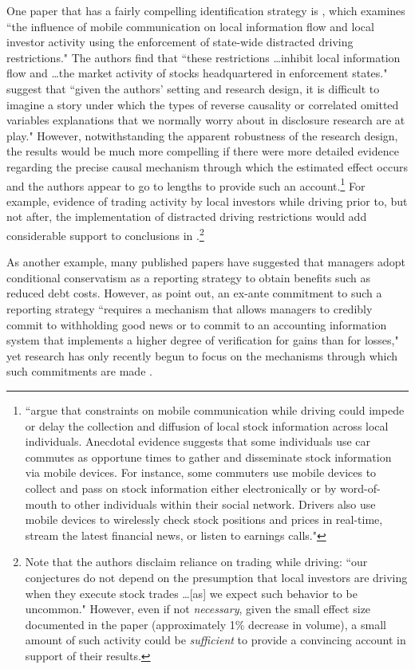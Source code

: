 \documentclass[12pt,reqno,titlepage]{amsart}
\theoremstyle{definition}
\begin{document}
\begin{doublespace}
One paper that has a fairly compelling identification strategy is \citet{Brown:2015ik}, which examines ``the influence of mobile communication on local information flow and local investor activity using the enforcement of state-wide distracted driving restrictions."
The authors find that ``these restrictions \dots inhibit local information flow and \dots the market activity of stocks headquartered in enforcement states."
\citet[p.\,229]{Miller:2015ec} suggest that ``given the authors' setting and research design, it is difficult to imagine a story under which the types of reverse causality or correlated omitted variables explanations that we normally worry about in disclosure research are at play."
However, notwithstanding the apparent robustness of the research design, the results would be much more compelling if there were more detailed evidence regarding the precise causal mechanism through which the estimated effect occurs and the authors appear to go to lengths to provide such an account.\footnote{
\citet[pp.\,277-278]{Brown:2015ik} ``argue that constraints on mobile communication while driving could impede or delay the collection and diffusion of local stock information across local individuals. 
Anecdotal evidence suggests that some individuals use car commutes as opportune times to gather and disseminate stock information via mobile devices. 
For instance, some commuters use mobile devices to collect and pass on stock information either electronically or by word-of-mouth to other individuals within their social network.
Drivers also use mobile devices to wirelessly check stock positions and prices in real-time, stream the latest financial news, or listen to earnings calls."}
For example, evidence of trading activity by local investors while driving prior to, but not after, the implementation of distracted driving restrictions would add considerable support to conclusions in \citet{Brown:2015ik}.\footnote{
Note that the authors disclaim reliance on trading while driving: ``our conjectures do not depend on the presumption that local investors are driving when they execute stock trades \dots [as] we expect such behavior to be uncommon."
However, even if not \emph{necessary}, given the small effect size documented in the paper (approximately 1\% decrease in volume), a small amount of such activity could be \emph{sufficient} to provide a convincing account in support of their results.}

As another example, many published papers have suggested that managers adopt conditional conservatism as a reporting strategy to obtain benefits such as reduced debt costs.
However, as  \citet[p.\,317]{Beyer:2010cj}  point out, an ex-ante commitment to such a reporting strategy ``requires a mechanism that allows managers to credibly commit to withholding good news or to commit to an accounting information system that implements a higher degree of verification for gains than for losses," yet research has only recently begun to focus on the mechanisms through which such commitments are made \citep[e.g.,][]{Erkens:2014hj}. 


\end{doublespace}
\end{document}
